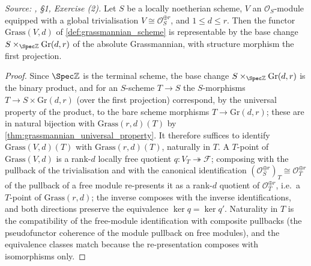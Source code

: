 \begin{lemma}\leanok
  \label{lem:grassmannian_representable_free}
  \textit{Source: \cite{nitsure-hilbert-quot}, \S 1, Exercise (2).}
  Let \(S\) be a locally noetherian scheme, \(V\) an \(\mathcal{O}_S\)-module
  equipped with a global trivialisation \(V \cong \mathcal{O}_S^{\oplus r}\),
  and \(1 \le d \le r\). Then the functor \(\mathrm{Grass}(V, d)\) of
  \cref{def:grassmannian_scheme} is representable by the base change
  \(S \times_{\Spec \mathbb{Z}} \mathrm{Gr}(d,r)\) of the absolute
  Grassmannian, with structure morphism the first projection.
\end{lemma}

\begin{proof}\leanok
  Since \(\Spec \mathbb{Z}\) is the terminal scheme, the base change
  \(S \times_{\Spec\mathbb{Z}} \mathrm{Gr}(d,r)\) is the binary product, and
  for an \(S\)-scheme \(T \to S\) the \(S\)-morphisms
  \(T \to S \times \mathrm{Gr}(d,r)\) (over the first projection) correspond,
  by the universal property of the product, to the bare scheme morphisms
  \(T \to \mathrm{Gr}(d,r)\); these are in natural bijection with
  \(\mathrm{Grass}(r,d)(T)\) by \cref{thm:grassmannian_universal_property}.
  It therefore suffices to identify \(\mathrm{Grass}(V,d)(T)\) with
  \(\mathrm{Grass}(r,d)(T)\), naturally in \(T\).  A \(T\)-point of
  \(\mathrm{Grass}(V,d)\) is a rank-\(d\) locally free quotient
  \(q : V_T \twoheadrightarrow \mathcal{F}\); composing with the pullback of
  the trivialisation and with the canonical identification
  \((\mathcal{O}_S^{\oplus r})_T \cong \mathcal{O}_T^{\oplus r}\) of the
  pullback of a free module re-presents it as a rank-\(d\) quotient of
  \(\mathcal{O}_T^{\oplus r}\), i.e.\ a \(T\)-point of
  \(\mathrm{Grass}(r,d)\); the inverse composes with the inverse
  identifications, and both directions preserve the equivalence
  \(\ker q = \ker q'\).  Naturality in \(T\) is the compatibility of the
  free-module identification with composite pullbacks (the pseudofunctor
  coherence of the module pullback on free modules), and the equivalence
  classes match because the re-presentation composes with isomorphisms only.
\end{proof}

